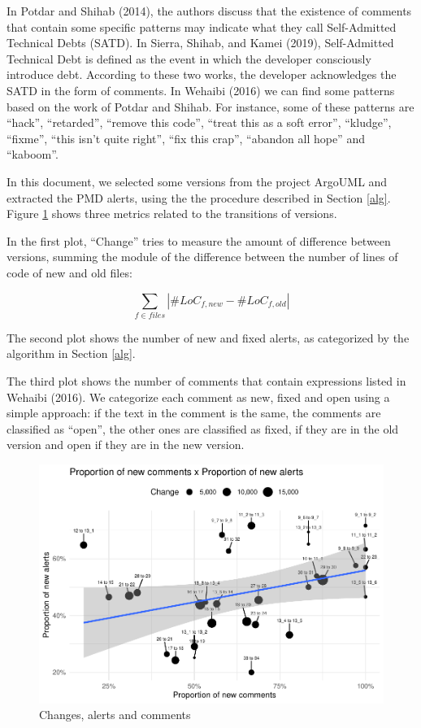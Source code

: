 \documentclass[
]{article}
\begin{document}
In Potdar and Shihab (2014), the authors discuss that the existence of
comments that contain some specific patterns may indicate what they call
Self-Admitted Technical Debts (SATD). In Sierra, Shihab, and Kamei
(2019), Self-Admitted Technical Debt is defined as the event in which
the developer consciously introduce debt. According to these two works,
the developer acknowledges the SATD in the form of comments. In Wehaibi
(2016) we can find some patterns based on the work of Potdar and Shihab.
For instance, some of these patterns are ``hack'', ``retarded'',
``remove this code'', ``treat this as a soft error'', ``kludge'',
``fixme'', ``this isn't quite right'', ``fix this crap'', ``abandon all
hope'' and ``kaboom''.

In this document, we selected some versions from the project ArgoUML and
extracted the PMD alerts, using the the procedure described in Section
\ref{alg}. Figure \ref{timeseries} shows three metrics related to the
transitions of versions.

In the first plot, ``Change'' tries to measure the amount of difference
between versions, summing the module of the difference between the
number of lines of code of new and old files:

\begin{equation} \label{eq_change} \sum_{f \in files}{|\#LoC_{f, new} - \#LoC_{f, old}|} \end{equation}

The second plot shows the number of new and fixed alerts, as categorized
by the algorithm in Section \ref{alg}.

The third plot shows the number of comments that contain expressions
listed in Wehaibi (2016). We categorize each comment as new, fixed and
open using a simple approach: if the text in the comment is the same,
the comments are classified as ``open'', the other ones are classified
as fixed, if they are in the old version and open if they are in the new
version.

\small

\normalsize

\small

\begin{figure}
\centering
\includegraphics{report_files/figure-latex/unnamed-chunk-21-1.pdf}
\caption{\label{timeseries}Changes, alerts and comments}
\end{figure}
\end{document}
